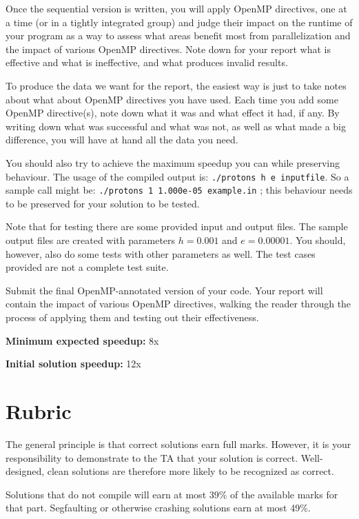 \documentclass[letterpaper,10pt]{article}
\begin{document}
Once the sequential version is written, you will apply OpenMP directives, one at a time (or in a tightly integrated group) and judge their impact on the runtime of your program as a way to assess what areas benefit most from parallelization and the impact of various OpenMP directives. Note down for your report what is effective and what is ineffective, and what produces invalid results. 

To produce the data we want for the report, the easiest way is just to take notes about what about OpenMP directives you have used. Each time you add some OpenMP directive(s), note down what it was and what effect it had, if any. By writing down what was successful and what was not, as well as what made a big difference, you will have at hand all the data you need.

You should also try to achieve the maximum speedup you can while preserving behaviour. The usage of the compiled output is: \texttt{./protons h e inputfile}. So a sample call might be: \texttt{./protons 1 1.000e-05 example.in} ; this behaviour needs to be preserved for your solution to be tested.

Note that for testing there are some provided input and output files. The sample output files are created with parameters $h=0.001$ and $e=0.00001$. You should, however, also do some tests with other parameters as well. The test cases provided
are not a complete test suite.

Submit the final OpenMP-annotated version of your code. Your report will contain the impact of various OpenMP directives, walking the reader through the process of applying them and testing out their effectiveness.

\squishlist
  \item {\bf Minimum expected speedup:} 8x
  \item {\bf Initial solution speedup:} 12x
\squishend


\section*{Rubric}

The general principle is that correct solutions earn full marks.
However, it is your responsibility to demonstrate to the TA
that your solution is correct. Well-designed, clean solutions 
are therefore more likely to be recognized as correct. 

Solutions that do not compile will earn at most 39\% of the available
marks for that part. Segfaulting or otherwise crashing solutions earn
at most 49\%.
\end{document}
